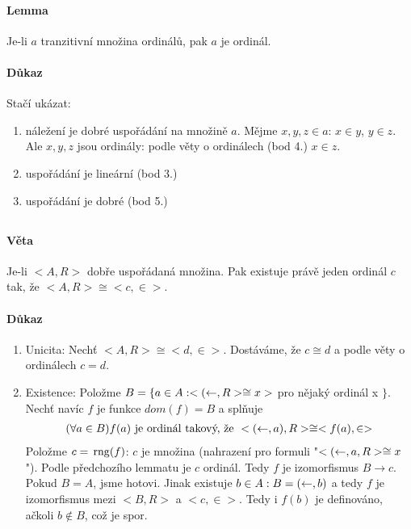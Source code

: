 \documentclass[a4paper,12pt,titlepage]{article}
\begin{document}
\paragraph{Lemma}
Je-li $a$ tranzitivní množina ordinálů, pak $a$ je ordinál.
\paragraph{Důkaz}
Stačí ukázat:
\begin{enumerate}
\item 
 náležení je dobré uspořádání na množině $a$. Mějme $x ,y, z \in
a$: $x \in y$, $y \in z$. Ale $x, y, z$ jsou ordinály: podle věty o ordinálech
(bod 4.) $x \in z$.
\item uspořádání je lineární (bod 3.)
\item uspořádání je dobré (bod 5.)
\end{enumerate}

\subsection{}
\setcounter{equation}{0}
\paragraph{Věta}
Je-li $<A, R>$ dobře uspořádaná množina. Pak existuje právě jeden ordinál $c$
tak, že $<A,R> \cong <c, \in>$.
\paragraph{Důkaz}
\begin{enumerate}
	\item Unicita: Nechť $<A, R> \cong <d, \in>$. Dostáváme, že $c \cong d$ a
	podle věty o ordinálech $c = d$.
	\item Existence: Položme $B = \{ a \in A : <(\leftarrow, R>\cong x> $ pro nějaký
	ordinál x $\}$. Nechť navíc $f$ je funkce $dom(f) = B$ a splňuje 
	\begin{align}
		(\forall a \in B) f(a) \text{ je ordinál takový, že } < (\leftarrow, a), R>
		\cong <f(a), \in>
	\end{align}
	Položme $c = \operatorname*{\,rng}(f)$: $c$ je množina (nahrazení pro formuli "$<(\leftarrow, a,
	R>\cong x$"). Podle předchozího lemmatu je $c$ ordinál. Tedy $f$ je
	izomorfismus $B \to c$. Pokud $B = A$, jsme hotovi. Jinak existuje $b \in A
	: B = (\leftarrow, b)$ a tedy $f$ je izomorfismus mezi $<B, R>$ a $<c, \in>$. Tedy
	i $f(b)$ je definováno, ačkoli $b \nin B$, což je spor.
\end{enumerate}
\end{document}
